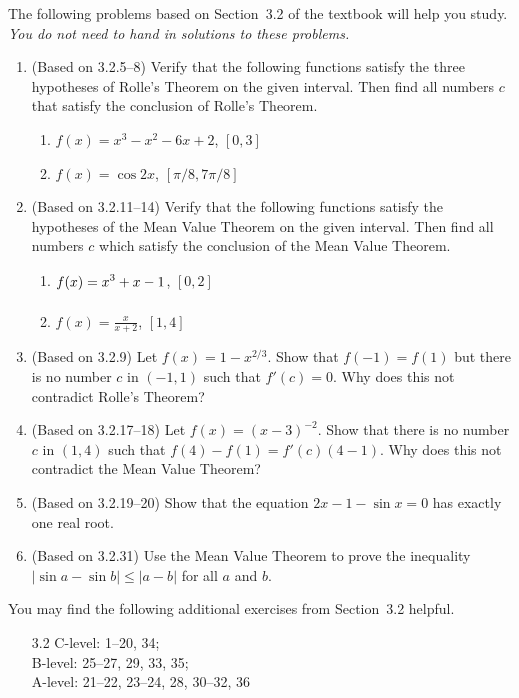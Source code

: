 \documentclass{article}
\title{\commonPSTitleZeroThreeTwo}
\author{\commonAuthor}
\date{\commonDateZeroThreeTwo}
\newcommand{\ds}{\displaystyle}
\begin{document}
\maketitle
\thispagestyle{empty}

\noindent
The following problems based on Section~3.2 of the textbook will help
you study.  \emph{You do not need to hand in solutions to these
  problems.}
\begin{enumerate}
\item (Based on 3.2.5--8)
  Verify that the following functions satisfy the three hypotheses of Rolle's
  Theorem on the given interval.  Then find all numbers $c$ that satisfy
  the conclusion of Rolle's Theorem.
  \begin{multicols}{2}
  \begin{enumerate}
  \item $f(x)=x^3-x^2-6x+2$, $[0,3]$
  \item $f(x)=\cos 2x$, $[\pi/8,7\pi/8]$
  \end{enumerate}
  \end{multicols}
\item (Based on 3.2.11--14)
  Verify that the following functions satisfy the hypotheses of the Mean Value
  Theorem on the given interval.  Then find all numbers $c$ which satisfy
  the conclusion of the Mean Value Theorem.
  \begin{multicols}{2}
  \begin{enumerate}
  \item $\ds f(x)=x^3+x-1\vphantom{\frac{x}{x+2}}$, $[0,2]$
  \item $\ds f(x)=\frac{x}{x+2}$, $[1,4]$
  \end{enumerate}
  \end{multicols}
\item (Based on 3.2.9)
  Let $f(x)=1-x^{2/3}$.  Show that $f(-1)=f(1)$ but there is no number
  $c$ in $(-1,1)$ such that $f'(c)=0$.  Why does this not contradict
  Rolle's Theorem?
\item (Based on 3.2.17--18)
  Let $f(x)=(x-3)^{-2}$.  Show that there is no number $c$ in
  $(1,4)$ such that $f(4)-f(1)=f'(c)(4-1)$.  Why does this not 
  contradict the Mean Value Theorem?
\item (Based on 3.2.19--20)
  Show that the equation $2x-1-\sin x=0$ has exactly one real root.
\item (Based on 3.2.31)
  Use the Mean Value Theorem to prove the inequality 
  $|\sin a-\sin b|\le |a-b|$ for all $a$ and $b$.
\end{enumerate}

\noindent
You may find the following additional exercises from Section~3.2
helpful.
\begin{itemize}
\item[3.2] 
  C-level: 1--20, 34; \\
  B-level: 25--27, 29, 33, 35; \\
  A-level: 21--22, 23--24, 28, 30--32, 36
\end{itemize}
\end{document}
